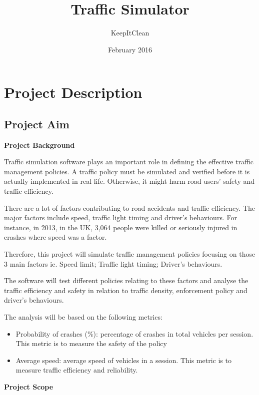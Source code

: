 \documentclass[11pt]{article}
\author{KeepItClean}
\title{Traffic Simulator}
\date{February 2016}
\begin{document}
\maketitle
\newpage

\section{Project Description}
\subsection{Project Aim}
\begin{flushleft}
\textbf{Project Background}\par	
\end{flushleft}

Traffic simulation software plays an important role in defining the effective traffic management policies. A traffic policy must be simulated and verified before it is actually implemented in real life. Otherwise, it might harm road users’ safety and traffic efficiency.

There are a lot of factors contributing to road accidents and traffic efficiency. The major factors include speed, traffic light timing and driver’s behaviours. For instance, in 2013, in the UK, 3,064 people were killed or seriously injured in crashes where speed was a factor.

Therefore, this project will simulate traffic management policies focusing on those 3 main factors ie. Speed limit; Traffic light timing; Driver’s behaviours.

The software will test different policies relating to these factors and analyse the traffic efficiency and safety in relation to traffic density, enforcement policy and driver’s behaviours.

The analysis will be based on the following metrics:
\begin{itemize}
	\item Probability of crashes (\%): percentage of crashes in total vehicles per session. This metric is to measure the safety of the policy
	\item Average speed: average speed of vehicles in a session. This metric is to measure traffic efficiency and reliability.
\end{itemize}

\begin{flushleft}
\textbf{Project Scope} \par	
\end{flushleft}
\end{document}
